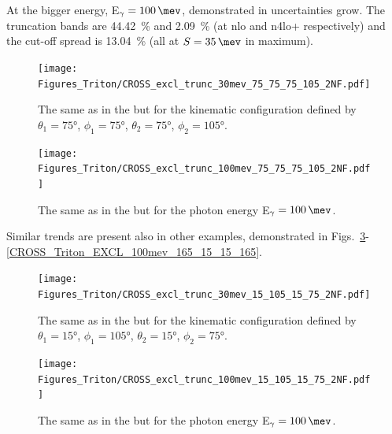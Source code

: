     At the bigger energy, E$_\gamma=\SI{100}{\mev}$, demonstrated in 
    uncertainties grow. The truncation bands are \SI{44.42}{\percent} and 
    \SI{2.09}{\percent} (at \gls{nlo} and \gls{n4lo+} respectively) and
    the cut-off spread is \SI{13.04}{\percent} (all at $S=\SI{35}{\mev}$ in maximum).


    \begin{figure}[h]
        \begin{center}
            \texttt{[image: Figures\_Triton/CROSS\_excl\_trunc\_30mev\_75\_75\_75\_105\_2NF.pdf]}
            \end{center}
            \caption{The same as in the  but for the kinematic
            configuration defined by
            $\theta_1 = \ang{75}$, $\phi_1 = \ang{75}$,
            $\theta_2 = \ang{75}$, $\phi_2 = \ang{105}$.}
            \label{CROSS_Triton_EXCL_75_75_75_105}
    \end{figure}


    \begin{figure}[h]
        \begin{center}
            \texttt{[image: Figures\_Triton/CROSS\_excl\_trunc\_100mev\_75\_75\_75\_105\_2NF.pdf]}
            \end{center}
            \caption{The same as in the  but for the photon energy
            E$_\gamma = \SI{100}{\mev}$.}
            \label{CROSS_Triton_EXCL_100mev_75_75_75_105}
    \end{figure}

    Similar trends are present also in other examples, demonstrated in
    Figs.~\ref{CROSS_Triton_EXCL_15_105_15_75}-\ref{CROSS_Triton_EXCL_100mev_165_15_15_165}.

    \begin{figure}[h]
        \begin{center}
            \texttt{[image: Figures\_Triton/CROSS\_excl\_trunc\_30mev\_15\_105\_15\_75\_2NF.pdf]}
            \end{center}
            \caption{The same as in the  but for the kinematic
            configuration defined by
            $\theta_1 = \ang{15}$, $\phi_1 = \ang{105}$,
            $\theta_2 = \ang{15}$, $\phi_2 = \ang{75}$.}
            \label{CROSS_Triton_EXCL_15_105_15_75}
    \end{figure}


    \begin{figure}[h]
        \begin{center}
            \texttt{[image: Figures\_Triton/CROSS\_excl\_trunc\_100mev\_15\_105\_15\_75\_2NF.pdf]}
            \end{center}
            \caption{The same as in the  but for the photon energy
            E$_\gamma = \SI{100}{\mev}$.}
            \label{CROSS_Triton_EXCL_100mev_15_105_15_75}
    \end{figure}

